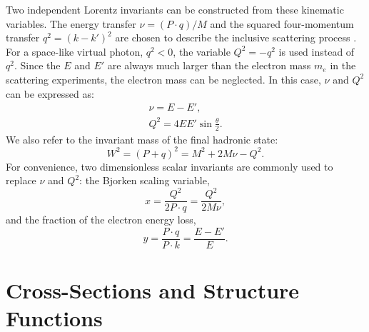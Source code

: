 Two independent Lorentz invariants can be constructed from these kinematic variables. The energy transfer $\nu=(P\cdot q)/M$ and the squared four-momentum transfer $q^2=(k-k')^2$ are chosen to describe the inclusive scattering process \cite{Halzen1984}. For a space-like virtual photon, $q^2<0$, the variable $Q^2=-q^2$ is used instead of $q^2$. Since the $E$ and $E'$ are always much larger than the electron mass $m_e$ in the scattering experiments, the electron mass can be neglected. In this case, $\nu$ and $Q^2$ can be expressed as:
\begin{gather} \label{C2S1E1}
\nu = E-E', \\ \label{C2S1E2}
Q^2 = 4EE'\sin\frac{\theta}{2}.
\end{gather}
We also refer to the invariant mass of the final hadronic state:
\begin{equation} \label{C2S1E3}
W^2 = (P+q)^2 = M^2+2M\nu-Q^2.
\end{equation}
For convenience, two dimensionless scalar invariants are commonly used to replace $\nu$ and $Q^2$: the Bjorken scaling variable,
\begin{equation}  \label{C2S1E4}
x = \frac{Q^2}{2P\cdot q}=\frac{Q^2}{2M\nu},
\end{equation}
and the fraction of the electron energy loss,
\begin{equation} \label{C2S1E5}
y = \frac{P\cdot q}{P\cdot k}=\frac{E-E'}{E}.
\end{equation}

\section{Cross-Sections and Structure Functions}
\label{C2S2}

